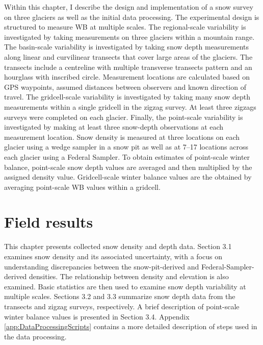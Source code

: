 \documentclass{sfuthesis}
\begin{document}
Within this chapter, I describe the design and implementation of a snow survey on three glaciers as well as the initial data processing. The experimental design is structured to measure WB at multiple scales. The regional-scale variability is investigated by taking measurements on three glaciers within a mountain range. The basin-scale variability is investigated by taking snow depth measurements along linear and curvilinear transects that cover large areas of the glaciers. The transects include a centreline with multiple transverse transects pattern and an hourglass with inscribed circle. Measurement locations are calculated based on GPS waypoints, assumed distances between observers and known direction of travel. The gridcell-scale variability is investigated by taking many snow depth measurements within a single gridcell in the zigzag survey. At least three zigzags surveys were completed on each glacier. Finally, the point-scale variability is investigated by making at least three snow-depth observations at each measurement location. Snow density is measured at three locations on each glacier using a wedge sampler in a snow pit as well as at 7--17 locations across each glacier using a Federal Sampler. To obtain estimates of point-scale winter balance, point-scale snow depth values are averaged and then multiplied by the assigned density value. Gridcell-scale winter balance values are the obtained by averaging point-scale WB values within a gridcell. 




\chapter{Field results}

This chapter presents collected snow density and depth data. Section 3.1 examines snow density and its associated uncertainty, with a focus on understanding discrepancies between the snow-pit-derived and Federal-Sampler-derived densities. The relationship between density and elevation is also examined. Basic statistics are then used to examine snow depth variability at multiple scales. Sections 3.2 and 3.3 summarize snow depth data from the transects and zigzag surveys, respectively. A brief description of point-scale winter balance values is presented in Section 3.4. Appendix \ref{app:DataProcessingScripts} contains a more detailed description of steps used in the data processing.
\end{document}
